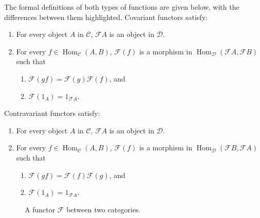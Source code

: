 \documentclass[10pt]{report}
\DeclareMathOperator{\hh}{Hom}
\begin{document}
The formal definitions of both types of functions are given below, with the differences between them highlighted. Covariant functors satisfy:
\begin{enumerate}
	\item For every object $A$ in $\mathscr{C}$, $\mathcal{F}A$ is an object in $\mathscr{D}$.
	\item For every $f \in \hh_{\mathscr{C}}(A,B)$, $\mathcal{F}(f)$ is a morphism in {\color{blue}$\hh_{\mathscr{D}}(\mathcal{F}A, \mathcal{F}B)$} such that
		\begin{enumerate}
			\item {\color{orange}$\mathcal{F}(gf) = \mathcal{F}(g) \mathcal{F}(f)$,} and
			\item $\mathcal{F}(1_{A}) = 1_{\mathcal{F}A}$.
		\end{enumerate}
\end{enumerate}
Contravariant functors satisfy:
\begin{enumerate}
	\item For every object $A$ in $\mathscr{C}$, $\mathcal{F}A$ is an object in $\mathscr{D}$.
	\item For every $f \in \hh_{\mathscr{C}}(A,B)$, $\mathcal{F}(f)$ is a morphism in {\color{blue}$\hh_{\mathscr{D}}(\mathcal{F}B, \mathcal{F}A)$} such that
                \begin{enumerate}
			\item {\color{orange}$\mathcal{F}(gf) = \mathcal{F}(f) \mathcal{F}(g)$,} and
                        \item $\mathcal{F}(1_{A}) = 1_{\mathcal{F}A}$.
                \end{enumerate}
\end{enumerate}

\begin{figure}[H]
	\centering
	\caption{A functor $\mathcal{F}$ between two categories.}
\end{figure}
\end{document}

